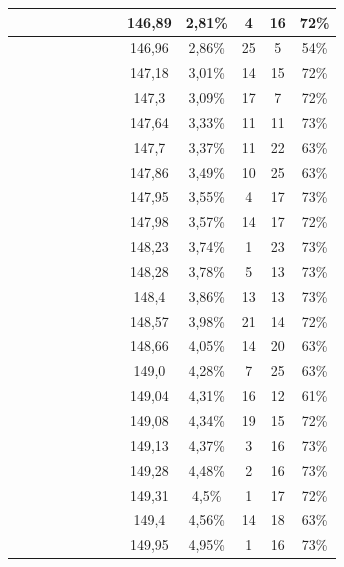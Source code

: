 \begin{center}
\begin{longtable}{|c|c|c|c|c|c|c|c|c|c|c|c|c|}
 \x &  \x &  \x &  \x &  \x &  \x &  \x &  \x & 146,89 & 2,81\% & 4 & 16 & 72\% \\ \hline
 \x &  \x &  &  &  &  &  &  \x & 146,96 & 2,86\% & 25 & 5 & 54\% \\ \hline
 \x &  \x &  \x &  &  &  \x &  &  \x & 147,18 & 3,01\% & 14 & 15 & 72\% \\ \hline
 \x &  &  \x &  \x &  &  \x &  &  \x & 147,3 & 3,09\% & 17 & 7 & 72\% \\ \hline
 \x &  &  &  &  &  \x &  \x &  \x & 147,64 & 3,33\% & 11 & 11 & 73\% \\ \hline
 \x &  &  \x &  &  &  &  &  \x & 147,7 & 3,37\% & 11 & 22 & 63\% \\ \hline
 \x &  \x &  \x &  &  &  &  &  \x & 147,86 & 3,49\% & 10 & 25 & 63\% \\ \hline
 \x &  &  &  &  \x &  \x &  \x &  \x & 147,95 & 3,55\% & 4 & 17 & 73\% \\ \hline
 \x &  &  \x &  &  &  \x &  &  \x & 147,98 & 3,57\% & 14 & 17 & 72\% \\ \hline
 \x &  &  &  &  \x &  \x &  \x &  \x & 148,23 & 3,74\% & 1 & 23 & 73\% \\ \hline
 \x &  \x &  &  \x &  &  \x &  \x &  \x & 148,28 & 3,78\% & 5 & 13 & 73\% \\ \hline
 \x &  &  &  \x &  \x &  \x &  \x &  \x & 148,4 & 3,86\% & 13 & 13 & 73\% \\ \hline
 \x &  \x &  &  \x &  &  \x &  &  \x & 148,57 & 3,98\% & 21 & 14 & 72\% \\ \hline
 \x &  \x &  \x &  \x &  &  &  &  \x & 148,66 & 4,05\% & 14 & 20 & 63\% \\ \hline
 \x &  \x &  \x &  \x &  &  &  &  \x & 149,0 & 4,28\% & 7 & 25 & 63\% \\ \hline
 \x &  \x &  &  &  \x &  &  &  \x & 149,04 & 4,31\% & 16 & 12 & 61\% \\ \hline
 \x &  &  &  \x &  &  \x &  &  \x & 149,08 & 4,34\% & 19 & 15 & 72\% \\ \hline
 \x &  &  \x &  &  &  \x &  \x &  \x & 149,13 & 4,37\% & 3 & 16 & 73\% \\ \hline
 \x &  \x &  \x &  &  &  \x &  \x &  \x & 149,28 & 4,48\% & 2 & 16 & 73\% \\ \hline
 \x &  \x &  &  \x &  \x &  \x &  &  \x & 149,31 & 4,5\% & 1 & 17 & 72\% \\ \hline
 \x &  &  \x &  &  \x &  &  &  \x & 149,4 & 4,56\% & 14 & 18 & 63\% \\ \hline
 \x &  \x &  \x &  &  &  \x &  &  \x & 149,95 & 4,95\% & 1 & 16 & 73\% \\ \hline

\end{longtable}
\end{center}
